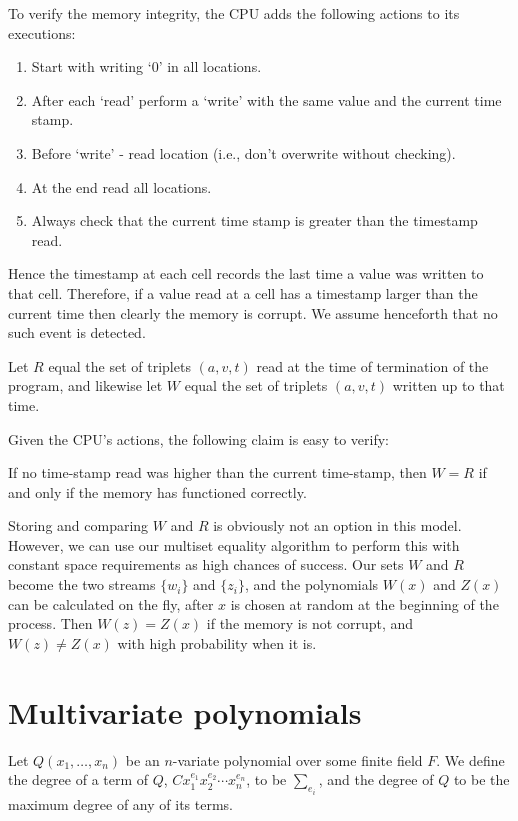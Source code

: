 \documentclass{article}
\begin{document}
To verify the memory integrity, the CPU adds the following actions to
its executions:
\begin{enumerate}
\item Start with writing `0' in all locations. 
\item After each `read' perform a `write' with the same value and the
  current time stamp.
\item Before `write' - read location (i.e., don't overwrite without
  checking).
\item At the end read all locations.
\item Always check that the current time stamp is greater than the
  timestamp read.
\end{enumerate}
Hence the timestamp at each cell records the last time a value was
written to that cell. Therefore, if a value read at a cell has a
timestamp larger than the current time then clearly the memory is
corrupt. We assume henceforth that no such event is detected.

Let $R$ equal the set of triplets $(a,v,t)$ read at the time of
termination of the program, and likewise let $W$ equal the set of
triplets $(a,v,t)$ written up to that time.

Given the CPU's actions, the following claim is easy to verify:
\begin{claim}
  If no time-stamp read was higher than the current time-stamp, then
  $W=R$ if and only if the memory has functioned correctly.
\end{claim}

Storing and comparing $W$ and $R$ is obviously not an option in this
model. However, we can use our multiset equality algorithm to perform
this with constant space requirements as high chances of success. Our
sets $W$ and $R$ become the two streams $\{w_i\}$ and $\{z_i\}$, and
the polynomials $W(x)$ and $Z(x)$ can be calculated on the fly, after
$x$ is chosen at random at the beginning of the process. Then
$W(z) = Z(x)$ if the memory is not corrupt, and $W(z) \neq Z(x)$ with
high probability when it is.


\section{Multivariate polynomials}
Let $Q({x_1, \ldots, x_n})$ be an $n$-variate polynomial over some
finite field $F$. We define the degree of a term of $Q$,
$Cx_1^{e_1}x_2^{e_2} \cdots x_n^{e_n}$, to be $\sum_{e_i}$, and the
degree of $Q$ to be the maximum degree of any of its terms.
\end{document}
